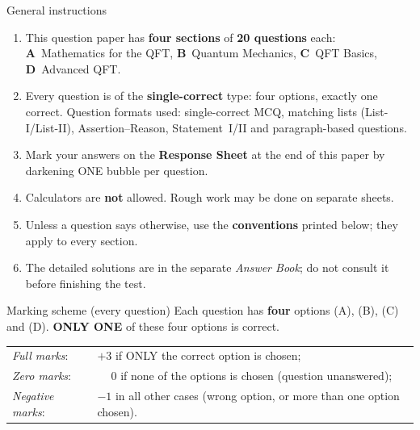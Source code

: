 \documentclass[11pt,a4paper]{article}
\begin{document}
\vspace{6pt}
\begin{infobox}{General instructions}
\begin{enumerate}[leftmargin=1.4em, itemsep=1pt, topsep=1pt]
\item This question paper has \textbf{four sections} of \textbf{20 questions} each:
\textbf{A}~Mathematics for the QFT, \textbf{B}~Quantum Mechanics, \textbf{C}~QFT Basics, \textbf{D}~Advanced QFT.
\item Every question is of the \textbf{single-correct} type: four options, exactly one correct. Question formats used:
single-correct MCQ, matching lists (List-I/List-II), Assertion--Reason, Statement~I/II and paragraph-based questions.
\item Mark your answers on the \textbf{Response Sheet} at the end of this paper by darkening ONE bubble per question.
\item Calculators are \textbf{not} allowed. Rough work may be done on separate sheets.
\item Unless a question says otherwise, use the \textbf{conventions} printed below; they apply to every section.
\item The detailed solutions are in the separate \emph{Answer Book}; do not consult it before finishing the test.
\end{enumerate}
\end{infobox}
\begin{infobox}{Marking scheme (every question)}
Each question has \textbf{four} options (A), (B), (C) and (D). \textbf{ONLY ONE} of these four options is correct.\\[2pt]
\begin{tabular}{@{}ll@{}}
\emph{Full marks}: & $+3$ if ONLY the correct option is chosen;\\
\emph{Zero marks}: & $\phantom{+}0$ if none of the options is chosen (question unanswered);\\
\emph{Negative marks}: & $-1$ in all other cases (wrong option, or more than one option chosen).
\end{tabular}
\end{infobox}
\end{document}
